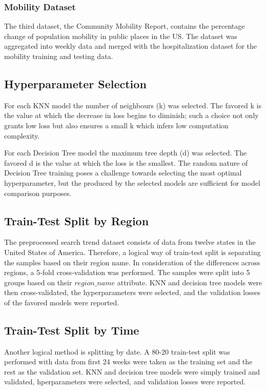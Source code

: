 \documentclass[12pt]{article}
\begin{document}
 
\subsubsection{Mobility Dataset}
The third dataset, the Community Mobility Report\cite{ds3}, contains the percentage change of population mobility in public places in the US. The dataset was aggregated into weekly data and merged with the hospitalization dataset for the mobility training and testing data.

\subsection{Hyperparameter Selection}
For each KNN model the number of neighbours (k) was selected. The favored k is the value at which the decrease in loss begins to diminish; such a choice not only grants low loss but also ensures a small k which infers low computation complexity.

For each Decision Tree model the maximum tree depth (d) was selected. The favored d is the value at which the loss is the smallest. The random nature of Decision Tree training poses a challenge towards selecting the most optimal hyperparameter, but the produced by the selected models are sufficient for model comparison purposes.

\subsection{Train-Test Split by Region}
The preprocessed search trend dataset consists of data from twelve states in the United States of America. Therefore, a logical way of train-test split is separating the samples based on their region name. In consideration of the differences across regions, a 5-fold cross-validation was performed. The samples were split into 5 groups based on their $region\_name$ attribute. KNN and decision tree models were then cross-validated, the hyperparameters were selected, and the validation losses of the favored models were reported.

\subsection{Train-Test Split by Time}
Another logical method is splitting by date. A 80-20 train-test split was performed with data from first 24 weeks were taken as the training set and the rest as the validation set. KNN and decision tree models were simply trained and validated, hperparameters were selected, and validation losses were reported.
\end{document}
